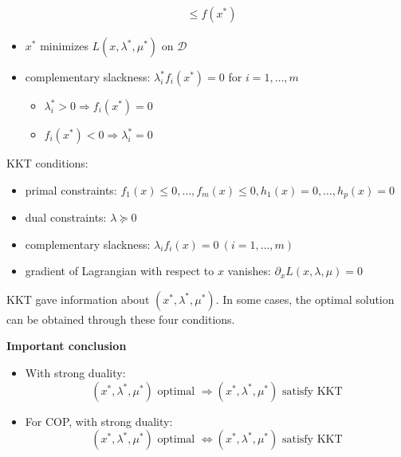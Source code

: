 \begin{remark}
\begin{itemize}
\begin{align*}
            &\leq f\left(x^{*}\right)
        \end{align*}\begin{itemize}
            \item $x^*$ minimizes $L(x, \lambda^*, \mu^*)$ on $\mathcal{D}$
            \item complementary slackness: $\lambda_i^*f_i(x^*) = 0$ for $i = 1, \dots, m$\begin{itemize}
                \item $\lambda_i^* > 0 \Longrightarrow f_i(x^*) = 0$
                \item $f_i(x^*) < 0 \Longrightarrow \lambda_i^* = 0$
            \end{itemize}
        \end{itemize}
    \end{itemize}
\end{remark}

\begin{remark}
    KKT conditions:\begin{itemize}
        \item primal constraints: $f_1(x) \le 0, \dots, f_m(x) \le 0, h_1(x) = 0, \dots,h_p(x) = 0$
        \item dual constraints: $\lambda \succeq 0$
        \item complementary slackness: $\lambda_if_i(x) = 0\ (i = 1, \dots, m)$
        \item gradient of Lagrangian with respect to $x$ vanishes: $\partial_xL(x, \lambda, \mu) = 0$
    \end{itemize}
    KKT gave information about $(x^*, \lambda^*, \mu^*)$. In some cases, the optimal solution can be obtained through these four conditions.
\end{remark}

\begin{remark}
    \textbf{Important conclusion}
    \begin{itemize}
        \item With strong duality: \[(x^*, \lambda^*, \mu^*) \text{ optimal } \Longrightarrow (x^*, \lambda^*, \mu^*) \text{ satisfy KKT}\]
        \item For COP, with strong duality:\[(x^*, \lambda^*, \mu^*) \text{ optimal } \Longleftrightarrow (x^*, \lambda^*, \mu^*) \text{ satisfy KKT}\]
    \end{itemize}
\end{remark}

